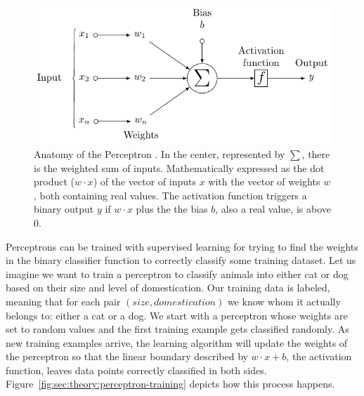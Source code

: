 \begin{figure}[htb]
  \includegraphics[width=\textwidth]{tkz/perceptron}
  \caption{Anatomy of the Perceptron \cite{Medina2013}.
    In the center, represented by $\sum$, there is the weighted sum of inputs.
    Mathematically expressed as the dot product (${w}\cdot{x}$) of the vector of inputs $x$ with the vector of weights $w$, both containing real values.
    The activation function triggers a binary output $y$ if ${w}\cdot{x}$ plus the the bias $b$, also a real value, is above $0$.}
  \label{fig:sec:theory:perceptron}
\end{figure}

Perceptrons can be trained with supervised learning for trying to find the weights in the binary classifier function to correctly classify some training dataset.
Let us imagine we want to train a perceptron to classify animals into either cat or dog based on their size and level of domestication.
Our training data is labeled, meaning that for each pair $(size, domestication)$ we know whom it actually belongs to: either a cat or a dog.
We start with a perceptron whose weights are set to random values and the first training example gets classified randomly.
As new training examples arrive, the learning algorithm will update the weights of the perceptron so that the linear boundary described by ${w}\cdot{x}+b$, the activation function, leaves data points correctly classified in both sides.
Figure~\ref{fig:sec:theory:perceptron-training} depicts how this process happens.

